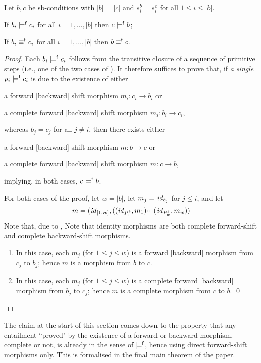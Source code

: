 \begin{proposition}
Let $b,c$ be sb-conditions with $|b|=|c|$ and $s^b_i=s^c_i$ for all $1\leq i\leq |b|$.
\begin{enumerateS}
\item If $b_i\models^{\mathsf f} c_i$ for all $i=1,\ldots,|b|$ then $c\models^{\mathsf f} b$;
\item If $b_i\equiv^{\mathsf f} c_i$ for all $i=1,\ldots,|b|$ then $b\equiv^{\mathsf f} c$.
\end{enumerateS}
\end{proposition}
%
\begin{proof}
Each $b_i\models^{\mathsf f} c_i$ follows from the transitive closure of a sequence of primitive steps (i.e., one of the two cases of ). It therefore suffices to prove that, if \emph{a single} $p_i\models^{\mathsf f} c_i$ is due to the existence of either
\begin{inumerate}
\item a forward [backward] shift morphism $m_i:c_i\to b_i$ or
\item a complete forward [backward] shift morphism $m_i:b_i\to c_i$,
\end{inumerate}
whereas $b_j=c_j$ for all $j\neq i$, then there exists either
\begin{inumerate}
\item a forward [backward] shift morphism $m:b\to c$ or 
\item a complete forward [backward] shift morphism $m:c\to b$,
\end{inumerate}
implying, in both cases, $c\models^{\mathsf f} b$.

\smallskip
For both cases of the proof, let $w=|b|$, let $m_j=\mathit{id}_{b_j}$ for $j\leq i$, and let
%
\[ m = (\mathit{id}_{[1,w]},((\mathit{id}_{P^b_1},m_1){\cdotp\mkern-2mu\cdotp\mkern-2mu\cdotp\mkern1mu} (\mathit{id}_{P^b_w},m_w)) \]
%
\iffull
Note that, due to ,
\else
Note that 
\fi
identity morphisms are both complete forward-shift and complete backward-shift morphisms.
%
\begin{enumerate}[label=\emph{(\roman*)}]
\item In this case, each $m_j$ (for $1\leq j\leq w$) is a forward [backward] morphism from $c_j$ to $b_j$; hence $m$ is a morphism from $b$ to $c$.

\item In this case, each $m_j$ (for $1\leq j\leq w$) is a complete forward [backward] morphism from $b_j$ to $c_j$; hence $m$ is a complete morphism from $c$ to $b$.
\qed
\end{enumerate}
\end{proof}
%
The claim at the start of this section comes down to the property that any entailment ``proved" by the existence of a forward or backward morphism, complete or not, is already {\fprovable} in the sense of $\models^{\mathsf f}$, hence using direct forward-shift morphisms only. This is formalised in the final main theorem of the paper.


